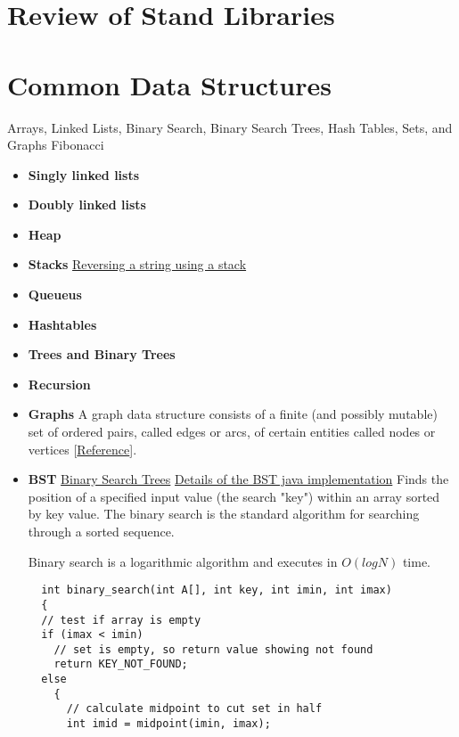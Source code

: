 \documentclass[letterpaper]{article}
\begin{document}
\section{Review of Stand Libraries}

\section{Common Data Structures}
Arrays, Linked Lists, Binary Search, Binary Search Trees, Hash Tables, Sets, and Graphs 
Fibonacci

\begin{itemize}
\item{\bf Singly linked lists}
\item{\bf Doubly linked lists}
\item{\bf Heap}
\item{\bf Stacks}
  \subitem \href{http://www.tutorialspoint.com/javaexamples/data_reverse.htm}{Reversing a string using a stack}
\item{\bf Queueus}
\item{\bf Hashtables}
\item{\bf Trees and Binary Trees}

\item{\bf Recursion}
\item{\bf Graphs} A graph data structure consists of a finite (and possibly mutable) set of ordered pairs, called edges or arcs, of certain entities called nodes or vertices [\href{http://en.wikipedia.org/wiki/Graph_(abstract_data_type)}{Reference}]. 
\item{\bf BST}
  \subitem \href{http://algs4.cs.princeton.edu/32bst/}{Binary Search Trees}
  \subitem \href{http://www.cs.princeton.edu/~rs/AlgsDS07/08BinarySearchTrees.pdf}{Details of 
  the BST java implementation}
  Finds the position of a specified input value (the search "key") within an array sorted 
  by key value.  The binary search is the standard algorithm for searching through a sorted sequence.


\subitem	 Binary search is a logarithmic algorithm and executes in $O(log N)$ time. 
  \begin{lstlisting}
  int binary_search(int A[], int key, int imin, int imax)
  {
  // test if array is empty
  if (imax < imin)
    // set is empty, so return value showing not found
    return KEY_NOT_FOUND;
  else
    {
      // calculate midpoint to cut set in half
      int imid = midpoint(imin, imax);
 

\end{lstlisting}
\end{itemize}
\end{document}
